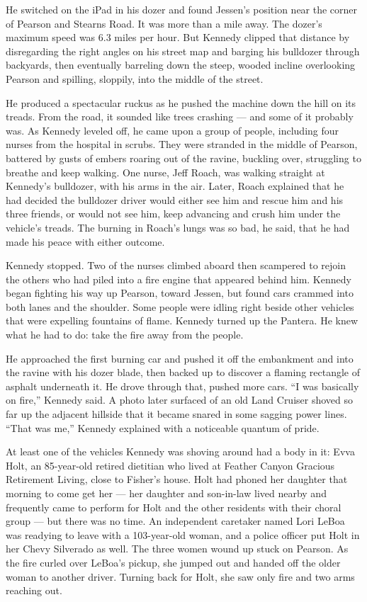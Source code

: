 He switched on the iPad in his dozer and found Jessen's position near
the corner of Pearson and Stearns Road. It was more than a mile away.
The dozer's maximum speed was 6.3 miles per hour. But Kennedy clipped
that distance by disregarding the right angles on his street map and
barging his bulldozer through backyards, then eventually barreling down
the steep, wooded incline overlooking Pearson and spilling, sloppily,
into the middle of the street.

He produced a spectacular ruckus as he pushed the machine down the hill
on its treads. From the road, it sounded like trees crashing --- and
some of it probably was. As Kennedy leveled off, he came upon a group of
people, including four nurses from the hospital in scrubs. They were
stranded in the middle of Pearson, battered by gusts of embers roaring
out of the ravine, buckling over, struggling to breathe and keep
walking. One nurse, Jeff Roach, was walking straight at Kennedy's
bulldozer, with his arms in the air. Later, Roach explained that he had
decided the bulldozer driver would either see him and rescue him and his
three friends, or would not see him, keep advancing and crush him under
the vehicle's treads. The burning in Roach's lungs was so bad, he said,
that he had made his peace with either outcome.

Kennedy stopped. Two of the nurses climbed aboard then scampered to
rejoin the others who had piled into a fire engine that appeared behind
him. Kennedy began fighting his way up Pearson, toward Jessen, but found
cars crammed into both lanes and the shoulder. Some people were idling
right beside other vehicles that were expelling fountains of flame.
Kennedy turned up the Pantera. He knew what he had to do: take the fire
away from the people.

He approached the first burning car and pushed it off the embankment and
into the ravine with his dozer blade, then backed up to discover a
flaming rectangle of asphalt underneath it. He drove through that,
pushed more cars. ``I was basically on fire,'' Kennedy said. A photo
later surfaced of an old Land Cruiser shoved so far up the adjacent
hillside that it became snared in some sagging power lines. ``That was
me,'' Kennedy explained with a noticeable quantum of pride.

At least one of the vehicles Kennedy was shoving around had a body in
it: Evva Holt, an 85-year-old retired dietitian who lived at Feather
Canyon Gracious Retirement Living, close to Fisher's house. Holt had
phoned her daughter that morning to come get her --- her daughter and
son-in-law lived nearby and frequently came to perform for Holt and the
other residents with their choral group --- but there was no time. An
independent caretaker named Lori LeBoa was readying to leave with a
103-year-old woman, and a police officer put Holt in her Chevy Silverado
as well. The three women wound up stuck on Pearson. As the fire curled
over LeBoa's pickup, she jumped out and handed off the older woman to
another driver. Turning back for Holt, she saw only fire and two arms
reaching out.

